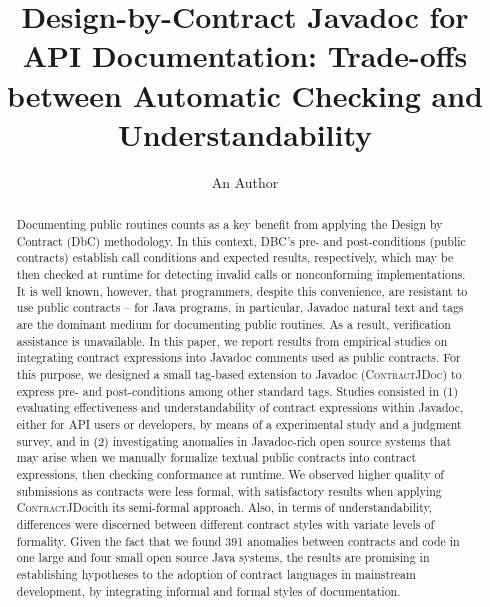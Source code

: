 \documentclass[a4paper,UKenglish]{lipics-v2018}
\title{Design-by-Contract Javadoc for API Documentation: Trade-offs between Automatic Checking and Understandability}
\author{An Author}{An Institution}{author@authors.com}{}{}
\newcommand{\contractjdoc}[1]{\textsc{ContractJDoc}}
\begin{document}
\maketitle

\begin{abstract}
Documenting public routines counts as a key benefit from applying the Design by Contract (DbC) methodology. 
In this context, DBC's pre- and post-conditions (public contracts) establish call conditions and expected results, respectively, which may be then checked at runtime for detecting invalid calls or nonconforming implementations.
%
It is well known, however, that programmers, despite this convenience, are resistant to use public contracts -- for Java programs, in particular, Javadoc natural text and tags are the dominant medium for documenting public routines.
As a result, verification assistance is unavailable.
%
In this paper, we report results from empirical studies on integrating contract expressions into Javadoc comments used as public contracts. 
For this purpose, we designed a small tag-based extension to Javadoc (\contractjdoc{}) to express pre- and post-conditions among other standard tags.
%
Studies consisted in (1) evaluating effectiveness and understandability of contract expressions within Javadoc, either for API users or developers, by means of a experimental study and a judgment survey, and in (2) investigating anomalies in Javadoc-rich open source systems that may arise when we manually formalize textual public contracts into contract expressions, then checking conformance at runtime.
%
We observed higher quality of submissions as contracts were less formal, with satisfactory results when applying \contractjdoc with its semi-formal approach. Also, in terms of understandability, differences were discerned between different contract styles with variate levels of formality.
Given the fact that we found 391 anomalies between contracts and code in one large and four small open source Java systems, the results are promising in establishing hypotheses to the adoption of contract languages in mainstream development, by integrating informal and formal styles of documentation.
\end{abstract}













\end{document}
